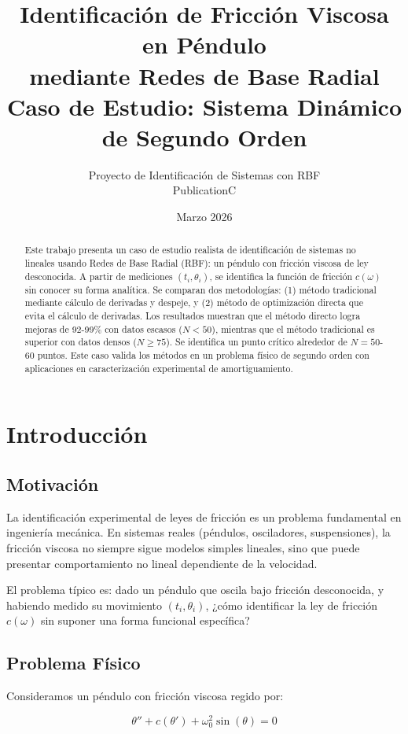 \documentclass[11pt,a4paper]{article}
\title{\textbf{Identificación de Fricción Viscosa en Péndulo\\mediante Redes de Base Radial}\\[0.5em]
\large Caso de Estudio: Sistema Dinámico de Segundo Orden}
\author{Proyecto de Identificación de Sistemas con RBF\\PublicationC}
\date{Marzo 2026}
\begin{document}
\maketitle

\begin{abstract}
Este trabajo presenta un caso de estudio realista de identificación de sistemas no lineales usando Redes de Base Radial (RBF): un péndulo con fricción viscosa de ley desconocida. A partir de mediciones $(t_i, \theta_i)$, se identifica la función de fricción $c(\omega)$ sin conocer su forma analítica. Se comparan dos metodologías: (1) método tradicional mediante cálculo de derivadas y despeje, y (2) método de optimización directa que evita el cálculo de derivadas. Los resultados muestran que el método directo logra mejoras de 92-99\% con datos escasos ($N < 50$), mientras que el método tradicional es superior con datos densos ($N \geq 75$). Se identifica un punto crítico alrededor de $N = 50$-$60$ puntos. Este caso valida los métodos en un problema físico de segundo orden con aplicaciones en caracterización experimental de amortiguamiento.
\end{abstract}

\section{Introducción}

\subsection{Motivación}

La identificación experimental de leyes de fricción es un problema fundamental en ingeniería mecánica. En sistemas reales (péndulos, osciladores, suspensiones), la fricción viscosa no siempre sigue modelos simples lineales, sino que puede presentar comportamiento no lineal dependiente de la velocidad.

El problema típico es: dado un péndulo que oscila bajo fricción desconocida, y habiendo medido su movimiento $(t_i, \theta_i)$, ¿cómo identificar la ley de fricción $c(\omega)$ sin suponer una forma funcional específica?

\subsection{Problema Físico}

Consideramos un péndulo con fricción viscosa regido por:

\begin{equation}
\theta'' + c(\theta') + \omega_0^2 \sin(\theta) = 0
\end{equation}
\end{document}
